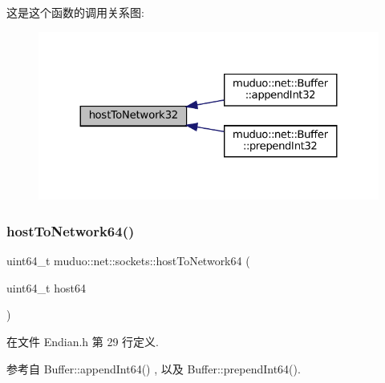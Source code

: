 这是这个函数的调用关系图\+:
\nopagebreak
\begin{figure}[H]
\begin{center}
\leavevmode
\includegraphics[width=324pt]{namespacemuduo_1_1net_1_1sockets_a4bb4a759c0f63477b89bac777f863cef_icgraph}
\end{center}
\end{figure}
\mbox{\label{namespacemuduo_1_1net_1_1sockets_ad0a6476a5e70fb475acf4e34f5a5f8cc}} 
\subsubsection{\texorpdfstring{host\+To\+Network64()}{hostToNetwork64()}}
{\footnotesize\ttfamily uint64\+\_\+t muduo\+::net\+::sockets\+::host\+To\+Network64 (\begin{DoxyParamCaption}\item[{uint64\+\_\+t}]{host64 }\end{DoxyParamCaption})\hspace{0.3cm}{\ttfamily [inline]}}



在文件 Endian.\+h 第 29 行定义.



参考自 Buffer\+::append\+Int64() , 以及 Buffer\+::prepend\+Int64().

